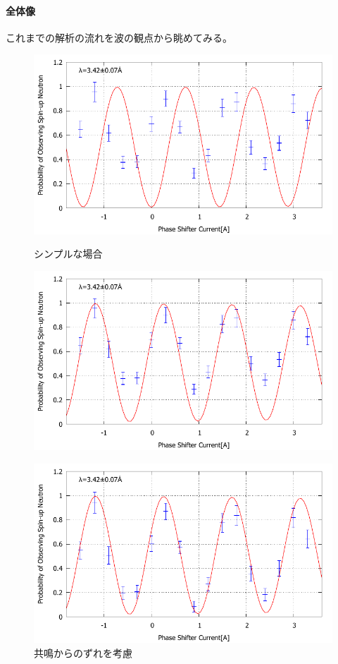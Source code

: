\paragraph{全体像}
これまでの解析の流れを波の観点から眺めてみる。

\begin{figure}[h]
\begin{minipage}{0.49\hsize}
\centering
\includegraphics[width=\hsize]{discussion/SEA/IT_0_480.pdf}
\caption{シンプルな場合}\label{Discussion2_fig_wave_simple}
\includegraphics[width=\hsize]{discussion/SEA/IT_e_480.pdf}
\caption{共鳴からのずれを考慮}\label{Discussion2_fig_waveve_resonance}
\includegraphics[width=\hsize]{discussion/SEA/IT_eb_480.pdf}

\end{minipage}
\end{figure}
